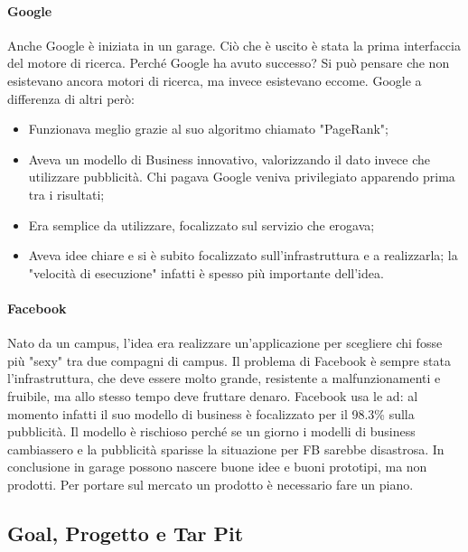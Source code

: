 \paragraph{Google}
Anche Google è iniziata in un garage. Ciò che è uscito è stata la prima interfaccia del motore di ricerca. Perché Google ha avuto successo? Si può pensare che non esistevano ancora motori di ricerca, ma invece esistevano eccome.\newline
Google a differenza di altri però:
\begin{itemize}
	\item Funzionava meglio grazie al suo algoritmo chiamato "PageRank";
	\item Aveva un modello di Business innovativo, valorizzando il dato invece che utilizzare pubblicità. Chi pagava Google veniva privilegiato apparendo prima tra i risultati;
	\item Era semplice da utilizzare, focalizzato sul servizio che erogava;
	\item Aveva idee chiare e si è subito focalizzato sull'infrastruttura e a realizzarla; la "velocità di esecuzione" infatti è spesso più importante dell'idea.
\end{itemize}
\paragraph{Facebook}
Nato da un campus, l'idea era realizzare un'applicazione per scegliere chi fosse più "sexy" tra due compagni di campus. Il problema di Facebook è sempre stata l'infrastruttura, che deve essere molto grande, resistente a malfunzionamenti e fruibile, ma allo stesso tempo deve fruttare denaro. Facebook usa le ad: al momento infatti il suo modello di business è focalizzato per il 98.3\% sulla pubblicità. Il modello è rischioso perché se un giorno i modelli di business cambiassero e la pubblicità sparisse la situazione per FB sarebbe disastrosa.\newline\newline
In conclusione in garage possono nascere buone idee e buoni prototipi, ma non prodotti. Per portare sul mercato un prodotto è necessario fare un piano.
\subsection{Goal, Progetto e Tar Pit}
